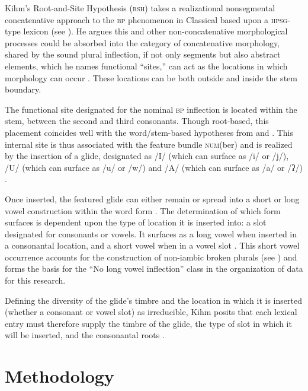 \documentclass[output=paper,modfonts]{langscibook}
\begin{document}
Kihm’s Root-and-Site Hypothesis (\textsc{rsh}) takes a realizational nonsegmental concatenative approach to the \textsc{bp} phenomenon in Classical  based upon a \textsc{hpsg}-type lexicon (see \citealt{Pollard1994}). He argues this and other non-concatenative morphological processes could be absorbed into the category of concatenative morphology, shared by the sound plural inflection, if not only segments but also abstract elements, which he names functional “sites,” can act as the locations in which morphology can occur \citep[69]{Kihm2006}. These locations can be both outside and inside the stem boundary. 

The functional site designated for the nominal \textsc{bp} inflection is located within the stem, between the second and third consonants. Though root-based, this placement coincides well with the word/stem-based hypotheses from \citet{Ratcliffe1998} and \citet{McCarthyPrince1990}. This  internal site is thus associated with the feature bundle \textsc{num}(ber) and is realized by the insertion of a glide, designated as /I/ (which can surface as /i/ or /j/), /U/ (which can surface as /u/ or /w/) and /A/ (which can surface as /a/ or /ʔ/) \citep[80]{Kihm2006}. 

Once inserted, the featured glide can either remain or spread into a short or long vowel construction within the word form \citep[80]{Kihm2006}. The determination of which form surfaces is dependent upon the type of location it is inserted into: a slot designated for consonants or vowels. It surfaces as a long vowel when inserted in a consonantal location, and a short vowel when in a vowel slot \citep[81]{Kihm2006}. This short vowel occurrence accounts for the construction of non-iambic broken plurals (see \citealt{McCarthyPrince1990}) and forms the basis for the “No long vowel inflection” class in the organization of data for this research. 

Defining the diversity of the glide’s timbre and the location in which it is inserted (whether a consonant or vowel slot) as irreducible, Kihm posits that each lexical entry must therefore supply the timbre of the glide, the type of slot in which it will be inserted, and the consonantal roots \citep[81]{Kihm2006}. 

\section{Methodology} 
\end{document}
